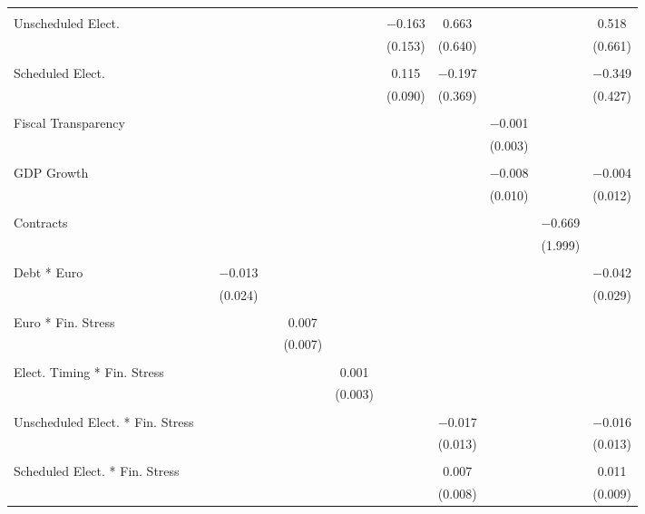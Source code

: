 \begin{table}[!htbp]
\begin{tabular}{@{\extracolsep{5pt}}lcccccccccc}
  & & & & & & & & & & \\ 
 Unscheduled Elect. &  &  &  &  &  & $-$0.163 & 0.663 &  &  & 0.518 \\ 
  &  &  &  &  &  & (0.153) & (0.640) &  &  & (0.661) \\ 
  & & & & & & & & & & \\ 
 Scheduled Elect. &  &  &  &  &  & 0.115 & $-$0.197 &  &  & $-$0.349 \\ 
  &  &  &  &  &  & (0.090) & (0.369) &  &  & (0.427) \\ 
  & & & & & & & & & & \\ 
 Fiscal Transparency &  &  &  &  &  &  &  & $-$0.001 &  &  \\ 
  &  &  &  &  &  &  &  & (0.003) &  &  \\ 
  & & & & & & & & & & \\ 
 GDP Growth &  &  &  &  &  &  &  & $-$0.008 &  & $-$0.004 \\ 
  &  &  &  &  &  &  &  & (0.010) &  & (0.012) \\ 
  & & & & & & & & & & \\ 
 Contracts &  &  &  &  &  &  &  &  & $-$0.669 &  \\ 
  &  &  &  &  &  &  &  &  & (1.999) &  \\ 
  & & & & & & & & & & \\ 
 Debt * Euro &  & $-$0.013 &  &  &  &  &  &  &  & $-$0.042 \\ 
  &  & (0.024) &  &  &  &  &  &  &  & (0.029) \\ 
  & & & & & & & & & & \\ 
 Euro * Fin. Stress &  &  &  & 0.007 &  &  &  &  &  &  \\ 
  &  &  &  & (0.007) &  &  &  &  &  &  \\ 
  & & & & & & & & & & \\ 
 Elect. Timing * Fin. Stress &  &  &  &  & 0.001 &  &  &  &  &  \\ 
  &  &  &  &  & (0.003) &  &  &  &  &  \\ 
  & & & & & & & & & & \\ 
 Unscheduled Elect. * Fin. Stress &  &  &  &  &  &  & $-$0.017 &  &  & $-$0.016 \\ 
  &  &  &  &  &  &  & (0.013) &  &  & (0.013) \\ 
  & & & & & & & & & & \\ 
 Scheduled Elect. * Fin. Stress &  &  &  &  &  &  & 0.007 &  &  & 0.011 \\ 
  &  &  &  &  &  &  & (0.008) &  &  & (0.009) \\ 

\end{tabular}
\end{table}
